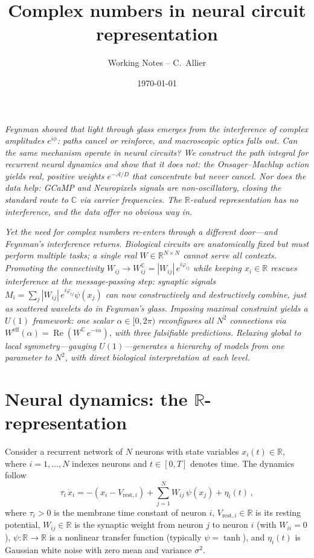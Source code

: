 \documentclass[11pt,a4paper]{article}
\title{Complex numbers in neural circuit representation}
\author{Working Notes -- C.\ Allier}
\date{\today}
\newcommand{\R}{\mathbb{R}}
\newcommand{\C}{\mathbb{C}}
\newcommand{\Weff}{W^{\text{eff}}}
\newcommand{\Wc}{W^{\mathbb{C}}}
\newcommand{\re}{\operatorname{Re}}
\begin{document}
\maketitle

\vspace{1em}
\noindent\textit{Feynman showed that light through glass emerges from the interference of complex amplitudes $e^{i\phi}$: paths cancel or reinforce, and macroscopic optics falls out. Can the same mechanism operate in neural circuits? We construct the path integral for recurrent neural dynamics and show that it does not: the Onsager--Machlup action yields real, positive weights $e^{-\mathcal{A}/D}$ that concentrate but never cancel. Nor does the data help: GCaMP and Neuropixels signals are non-oscillatory, closing the standard route to $\C$ via carrier frequencies. The $\R$-valued representation has no interference, and the data offer no obvious way in.}

\vspace{0.5em}
\noindent\textit{Yet the need for complex numbers re-enters through a different door---and Feynman's interference returns. Biological circuits are anatomically fixed but must perform multiple tasks; a single real $W \in \R^{N\times N}$ cannot serve all contexts. Promoting the connectivity $W_{ij} \to W_{ij}^{\C} = |W_{ij}|\,e^{i\varphi_{ij}}$ while keeping $x_i \in \R$ rescues interference at the message-passing step: synaptic signals $M_i = \sum_j |W_{ij}|\,e^{i\varphi_{ij}}\psi(x_j)$ can now constructively and destructively combine, just as scattered wavelets do in Feynman's glass. Imposing maximal constraint yields a $U(1)$ framework: one scalar $\alpha \in [0,2\pi)$ reconfigures all $N^2$ connections via $\Weff(\alpha) = \re(\Wc\, e^{-i\alpha})$, with three falsifiable predictions. Relaxing global to local symmetry---gauging $U(1)$---generates a hierarchy of models from one parameter to $N^2$, with direct biological interpretation at each level.}

\tableofcontents
\newpage

\part{Neural dynamics: the $\R$-representation}

Consider a recurrent network of $N$ neurons with state variables $x_i(t) \in \R$, where $i = 1,\ldots,N$ indexes neurons and $t \in [0,T]$ denotes time. The dynamics follow
\begin{equation}
\tau_i\,\dot{x}_i = -(x_i - V_{\text{rest},i}) + \sum_{j=1}^{N} W_{ij}\,\psi(x_j) + \eta_i(t)\,,
\label{eq:real_dynamics}
\end{equation}
where $\tau_i > 0$ is the membrane time constant of neuron $i$, $V_{\text{rest},i} \in \R$ is its resting potential, $W_{ij} \in \R$ is the synaptic weight from neuron $j$ to neuron $i$ (with $W_{ii} = 0$), $\psi: \R \to \R$ is a nonlinear transfer function (typically $\psi = \tanh$), and $\eta_i(t)$ is Gaussian white noise with zero mean and variance $\sigma^2$.
\end{document}

